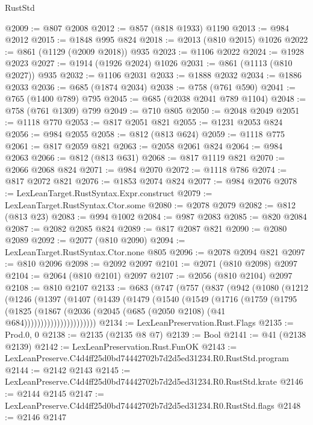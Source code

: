 \begin{lexlean}{RustStd}
\begin{coremodule}
@2009 := @807 @2008
@2012 := @857 (@818 @1933) @1190
@2013 := @984 @2012
@2015 := @1848 @995 @824
@2018 := @2013 (@810 @2015) @1026
@2022 := @861 (@1129 (@2009 @2018)) @935
@2023 := @1106 @2022
@2024 := @1928 @2023
@2027 := @1914 (@1926 @2024) @1026
@2031 := @861 (@1113 (@810 @2027)) @935
@2032 := @1106 @2031
@2033 := @1888 @2032
@2034 := @1886 @2033
@2036 := @685 (@1874 @2034)
@2038 := @758 (@761 @590)
@2041 := @765 (@1400 @789) @795
@2045 := @685 (@2038 @2041 @789 @1104)
@2048 := @758 (@761 @1309) @799
@2049 := @710 @805
@2050 := @2048 @2049
@2051 := @1118 @770
@2053 := @817 @2051 @821
@2055 := @1231 @2053 @824
@2056 := @984 @2055
@2058 := @812 (@813 @624)
@2059 := @1118 @775
@2061 := @817 @2059 @821
@2063 := @2058 @2061 @824
@2064 := @984 @2063
@2066 := @812 (@813 @631)
@2068 := @817 @1119 @821
@2070 := @2066 @2068 @824
@2071 := @984 @2070
@2072 := @1118 @786
@2074 := @817 @2072 @821
@2076 := @1853 @2074 @824
@2077 := @984 @2076
@2078 := LexLeanTarget.RustSyntax.Expr.construct
@2079 := LexLeanTarget.RustSyntax.Ctor.some
@2080 := @2078 @2079
@2082 := @812 (@813 @23)
@2083 := @994 @1002
@2084 := @987 @2083
@2085 := @820 @2084
@2087 := @2082 @2085 @824
@2089 := @817 @2087 @821
@2090 := @2080 @2089
@2092 := @2077 (@810 @2090)
@2094 := LexLeanTarget.RustSyntax.Ctor.none @805
@2096 := @2078 @2094 @821
@2097 := @810 @2096
@2098 := @2092 @2097
@2101 := @2071 (@810 @2098) @2097
@2104 := @2064 (@810 @2101) @2097
@2107 := @2056 (@810 @2104) @2097
@2108 := @810 @2107
@2133 := @683
    (@747
      (@757
        (@837
          (@942
            (@1080
              (@1212
                (@1246
                  (@1397
                    (@1407
                      (@1439
                        (@1479
                          (@1540
                            (@1549
                              (@1716
                                (@1759
                                  (@1795
                                    (@1825
                                      (@1867
                                        (@2036
                                          (@2045 (@685 (@2050 @2108) (@41 @684))))))))))))))))))))))
@2134 := LexLeanPreservation.Rust.Flags
@2135 := Prod.{0, 0}
@2138 := @2135 (@2135 @8 @7)
@2139 := Bool
@2141 := @41 (@2138 @2139)
@2142 := LexLeanPreservation.Rust.FunOK
@2143 := LexLeanPreserve.C4d4ff25d0bd74442702b7d2d5ed31234.R0.RustStd.program
@2144 := @2142 @2143
@2145 := LexLeanPreserve.C4d4ff25d0bd74442702b7d2d5ed31234.R0.RustStd.krate
@2146 := @2144 @2145
@2147 := LexLeanPreserve.C4d4ff25d0bd74442702b7d2d5ed31234.R0.RustStd.flags
@2148 := @2146 @2147

\end{coremodule}
\end{lexlean}
